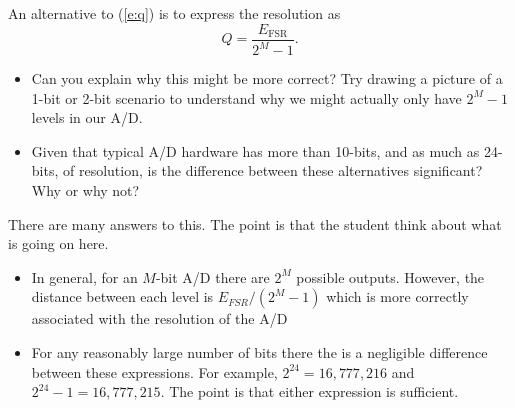 \begin{ex}
An alternative to (\ref{e:q}) is to express the resolution as 
\[
Q = \frac{E_{\mathrm{FSR}}}{2^M-1}.
\]
\begin{itemize}
\item Can you explain why this might be more correct?  Try drawing a picture of a 1-bit or 2-bit scenario to understand why we might actually only have $2^M-1$ levels in our A/D.
\item Given that typical A/D hardware has more than 10-bits, and as much as 24-bits, of resolution, is the difference between these alternatives significant?  Why or why not?
\end{itemize}
\end{ex}

\ifsolutions
\begin{soln}

There are many answers to this.  The point is that the student think about what is going on here.
\begin{itemize}
\item In general, for an $M$-bit A/D there are $2^M$ possible outputs.  However, the distance between each level is $E_{FSR}/(2^M-1)$ which is more correctly associated with the resolution of the A/D
\item For any reasonably large number of bits there the is a negligible difference between these expressions.  For example, $2^{24}=16,777,216$ and $2^{24}-1=16,777,215$.  The point is that either expression is sufficient.
\end{itemize}
\end{soln}
\fi

